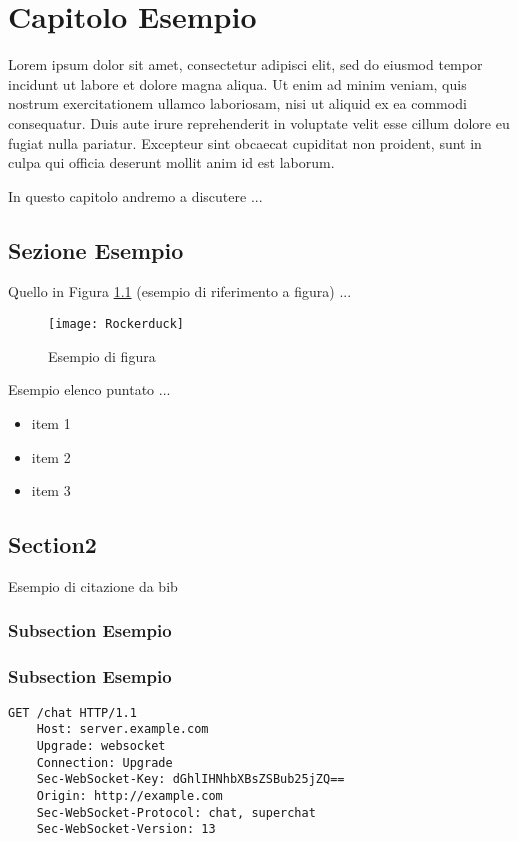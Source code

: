 \chapter{Capitolo Esempio}
\label{chap:Capitolo2}
\nocite{html5}

Lorem ipsum dolor sit amet, consectetur adipisci elit, sed do eiusmod tempor incidunt ut labore et dolore magna aliqua. Ut enim ad minim veniam, quis nostrum exercitationem ullamco laboriosam, nisi ut aliquid ex ea commodi consequatur. Duis aute irure reprehenderit in voluptate velit esse cillum dolore eu fugiat nulla pariatur. Excepteur sint obcaecat cupiditat non proident, sunt in culpa qui officia deserunt mollit anim id est laborum.

In questo capitolo andremo a discutere ...
  
\section{Sezione Esempio}
\label{sec:real-time}
Quello in Figura \ref{fig:rocker}  (esempio di riferimento a figura) ...

\begin{figure}[htpb!]
  \centering
  \texttt{[image: Rockerduck]}
  \caption{Esempio di figura}
  \label{fig:rocker}
\end{figure}

Esempio elenco puntato ...
\begin{itemize}
\item item 1
\item item 2
\item item 3
\end{itemize}


\section{Section2}


Esempio di citazione da bib \cite{MP} 

\subsection{Subsection Esempio}
\label{sec:handshake}

\subsection{Subsection Esempio}
\label{sec:handshake}

\begin{lstlisting}[caption={Esempio di listing}, style=javaScriptCode]
	GET /chat HTTP/1.1
	Host: server.example.com
	Upgrade: websocket
	Connection: Upgrade
	Sec-WebSocket-Key: dGhlIHNhbXBsZSBub25jZQ==
	Origin: http://example.com
	Sec-WebSocket-Protocol: chat, superchat
	Sec-WebSocket-Version: 13
\end{lstlisting} 


